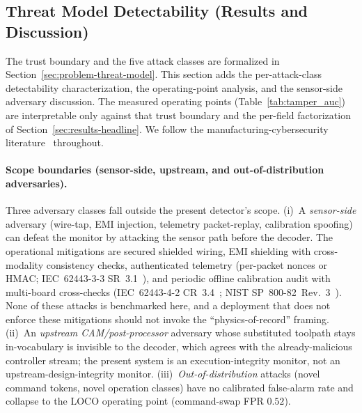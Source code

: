 \documentclass[sensors,article,submit,moreauthors,pdftex]{Definitions/mdpi}
\begin{document}
\subsection{Threat Model Detectability (Results and Discussion)}
\label{sec:disc-threat-model}

The trust boundary and the five attack classes are formalized in Section~\ref{sec:problem-threat-model}. This section adds the per-attack-class detectability characterization, the operating-point analysis, and the sensor-side adversary discussion. The measured operating points (Table~\ref{tab:tamper_auc}) are interpretable only against that trust boundary and the per-field factorization of Section~\ref{sec:results-headline}. We follow the manufacturing-cybersecurity literature~\cite{sturm2014cyber,yampolskiy2018security,kimmell2025cnc,zonouz2014plc,belikovetsky2017drowned,nist2023sp80082} throughout.

\paragraph{Scope boundaries (sensor-side, upstream, and out-of-distribution adversaries).} Three adversary classes fall outside the present detector's scope. (i)~A \emph{sensor-side} adversary (wire-tap, EMI injection, telemetry packet-replay, calibration spoofing) can defeat the monitor by attacking the sensor path before the decoder. The operational mitigations are secured shielded wiring, EMI shielding with cross-modality consistency checks, authenticated telemetry (per-packet nonces or HMAC; IEC~62443-3-3 SR~3.1~\cite{iec62443-3-3}), and periodic offline calibration audit with multi-board cross-checks (IEC~62443-4-2 CR~3.4~\cite{iec62443-4-2}; NIST SP~800-82~Rev.~3~\cite{nist2023sp80082}). None of these attacks is benchmarked here, and a deployment that does not enforce these mitigations should not invoke the ``physics-of-record'' framing. (ii)~An \emph{upstream CAM/post-processor} adversary whose substituted toolpath stays in-vocabulary is invisible to the decoder, which agrees with the already-malicious controller stream; the present system is an execution-integrity monitor, not an upstream-design-integrity monitor. (iii)~\emph{Out-of-distribution} attacks (novel command tokens, novel operation classes) have no calibrated false-alarm rate and collapse to the LOCO operating point (command-swap FPR $0.52$).
\end{document}
